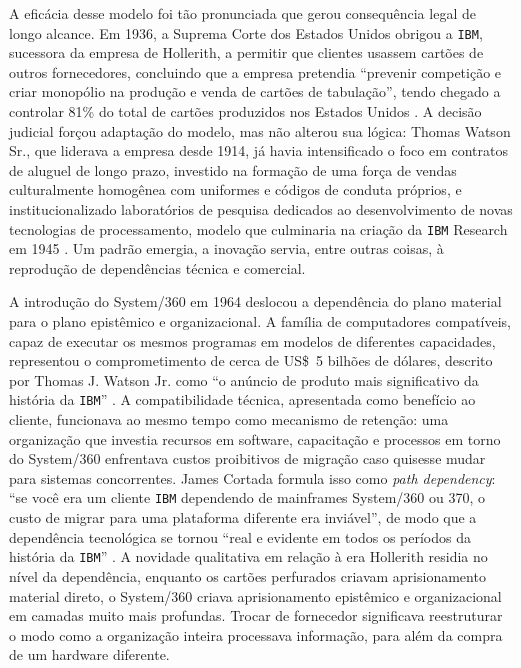 A eficácia desse modelo foi tão pronunciada que gerou consequência legal de longo alcance. Em 1936, a Suprema Corte dos Estados Unidos obrigou a \texttt{IBM}, sucessora da empresa de Hollerith, a permitir que clientes usassem cartões de outros fornecedores, concluindo que a empresa pretendia \enquote{prevenir competição e criar monopólio na produção e venda de cartões de tabulação}, tendo chegado a controlar 81\% do total de cartões produzidos nos Estados Unidos \parencite{Cortada2019IBM}. A decisão judicial forçou adaptação do modelo, mas não alterou sua lógica: Thomas Watson Sr., que liderava a empresa desde 1914, já havia intensificado o foco em contratos de aluguel de longo prazo, investido na formação de uma força de vendas culturalmente homogênea com uniformes e códigos de conduta próprios, e institucionalizado laboratórios de pesquisa dedicados ao desenvolvimento de novas tecnologias de processamento, modelo que culminaria na criação da \texttt{IBM} Research em 1945 \parencite{Pugh1995Building}. Um padrão emergia, a inovação servia, entre outras coisas, à reprodução de dependências técnica e comercial. 

A introdução do System/360 em 1964 deslocou a dependência do plano material para o plano epistêmico e organizacional. A família de computadores compatíveis, capaz de executar os mesmos programas em modelos de diferentes capacidades, representou o comprometimento de cerca de US\$~5 bilhões de dólares, descrito por Thomas J. Watson Jr. como \enquote{o anúncio de produto mais significativo da história da \texttt{IBM}} \parencite[p.~276]{Pugh1995Building}. A compatibilidade técnica, apresentada como benefício ao cliente, funcionava ao mesmo tempo como mecanismo de retenção: uma organização que investia recursos em software, capacitação e processos em torno do System/360 enfrentava custos proibitivos de migração caso quisesse mudar para sistemas concorrentes. James Cortada formula isso como \textit{path dependency}: \enquote{se você era um cliente \texttt{IBM} dependendo de mainframes System/360 ou 370, o custo de migrar para uma plataforma diferente era inviável}, de modo que a dependência tecnológica se tornou \enquote{real e evidente em todos os períodos da história da \texttt{IBM}} \parencite[p.~581]{Cortada2019IBM}. A novidade qualitativa em relação à era Hollerith residia no nível da dependência, enquanto os cartões perfurados criavam aprisionamento material direto, o System/360 criava aprisionamento epistêmico e organizacional em camadas muito mais profundas. Trocar de fornecedor significava reestruturar o modo como a organização inteira processava informação, para além da compra de um hardware diferente.

